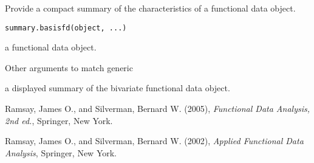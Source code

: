 \begin{Description}\relax
Provide a compact summary of the characteristics of a
functional data object.
\end{Description}
\begin{Usage}
\begin{verbatim}
summary.basisfd(object, ...)
\end{verbatim}
\end{Usage}
\begin{Arguments}
\begin{ldescription}
\item[\code{object}] a functional data object.

\item[\code{...}] Other arguments to match generic
\end{ldescription}
\end{Arguments}
\begin{Value}
a displayed summary of the bivariate functional data object.
\end{Value}
\begin{References}\relax
Ramsay, James O., and Silverman, Bernard W. (2005), \emph{Functional 
Data Analysis, 2nd ed.}, Springer, New York. 

Ramsay, James O., and Silverman, Bernard W. (2002), \emph{Applied
Functional Data Analysis}, Springer, New York.
\end{References}

